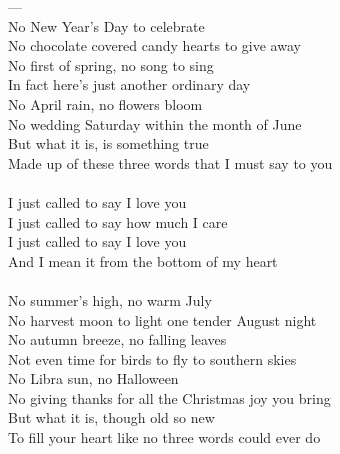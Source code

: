 \documentclass[a5paper, 10pt]{book}
\begin{document}
\begin{minipage}[t]{0.75\textwidth}
---\\

No New Year’s Day to celebrate 					\\
No chocolate covered candy hearts to give away 			\\
No first of spring, no song to sing 				\\
In fact here’s just another ordinary day\\
No April rain, no flowers bloom\\
No wedding Saturday within the month of June\\
But what it is, is something true\\
Made up of these three words that I must say to you\\
\\
\hspace*{5mm}I just called to say I love you 		\\
\hspace*{5mm}I just called to say how much I care\\
\hspace*{5mm}I just called to say I love you 		\\
\hspace*{5mm}And I mean it from the bottom of my heart\\
\\
No summer’s high, no warm July 				\\
No harvest moon to light one tender August night 		\\
No autumn breeze, no falling leaves 			\\
Not even time for birds to fly to southern skies\\
No Libra sun, no Halloween\\
No giving thanks for all the Christmas joy you bring\\
But what it is, though old so new\\
To fill your heart like no three words could ever do\\
\end{minipage}
\end{document}
